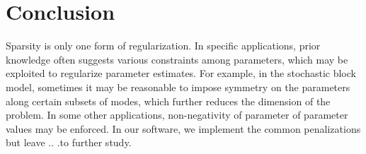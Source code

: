 \documentclass{article}
\begin{document}
\section{Conclusion}
Sparsity is only one form of regularization. In specific applications, prior knowledge often suggests various constraints among parameters, which may be exploited to regularize parameter estimates. For example, in the stochastic block model, sometimes it may be reasonable to impose symmetry on the parameters along certain subsets of modes, which further reduces the dimension of the problem. In some other applications, non-negativity of parameter of parameter values may be enforced. In our software, we implement the common penalizations but leave .. .to further study. 





\end{document}
